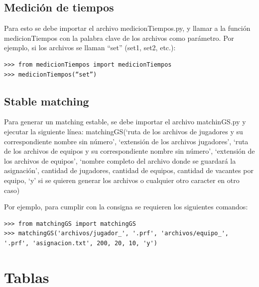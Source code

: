 \documentclass[article,a4paper]{article}
\begin{document}
\subsection{Medición de tiempos}
Para esto se debe importar el archivo medicionTiempos.py, y  llamar a la función medicionTiempos con la palabra clave de los archivos como parámetro. Por ejemplo, si los archivos se llaman “set” (set1, set2, etc.):

\begin{verbatim}
>>> from medicionTiempos import medicionTiempos
>>> medicionTiempos(“set”)
\end{verbatim}

\subsection{Stable matching}
 Para generar un matching estable, se debe importar el archivo matchinGS.py y ejecutar la siguiente línea:
matchingGS(‘ruta de los archivos  de jugadores y su correspondiente nombre sin número’, ‘extensión de los archivos jugadores’, ‘ruta de los archivos de equipos y su correspondiente nombre sin número’, ‘extensión de los archivos de equipos’, ‘nombre completo del archivo donde se guardará la asignación’, cantidad de jugadores, cantidad de equipos, cantidad de vacantes por equipo, ‘y’ si se quieren generar los archivos o cualquier otro caracter en otro caso)

Por ejemplo, para cumplir con la consigna se requieren los siguientes comandos:

\begin{verbatim}
>>> from matchingGS import matchingGS
>>> matchingGS('archivos/jugador_', '.prf', 'archivos/equipo_', '.prf', 'asignacion.txt', 200, 20, 10, 'y')
\end{verbatim}

\section{Tablas}
\end{document}
